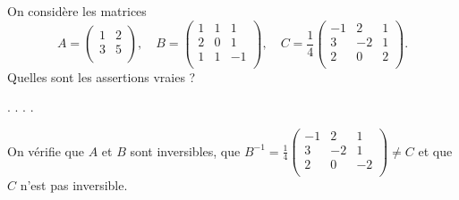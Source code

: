 \begin{question}
On considère les matrices 
$$A = \left(\begin{array}{rc}
1&2\\3&5\\ \end{array}\right),\quad B = \left(\begin{array}{rcc}
1&1&1\\2&0&1\\ 1&1&-1\\ \end{array}\right),\quad
C = \frac{1}{4}\left(\begin{array}{rcc}
-1&2&1\\3&-2&1\\ 2&0&2\\ \end{array}\right).$$
Quelles sont les assertions vraies ?
\begin{answers}  
.
.
.
.   
\end{answers}
\begin{explanations} On vérifie que $A$ et $B$ sont inversibles,  que $\displaystyle B^{-1} = \frac{1}{4}\left(\begin{array}{rcc}-1&2&1\\ 3&-2&1\\ 2&0&-2\\ \end{array}\right) \neq C$ et que $C$ n'est pas inversible.
\end{explanations}
\end{question}

